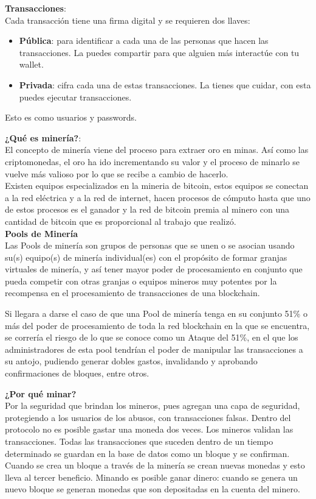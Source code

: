 \documentclass[a4paper,12pt]{/home/armando/Documentos/Cursos/LaTeX/Plantillas/lib/pub}
\begin{document}
\textbf{Transacciones}:\\
Cada transacción tiene una firma digital y se requieren dos llaves:
\begin{itemize}	
\item \textbf{Pública}: para identificar a cada una de las personas que hacen las transacciones.
La puedes compartir para que alguien más interactúe con tu wallet.
\item \textbf{Privada}: cifra cada una de estas transacciones.
La tienes que cuidar, con esta puedes ejecutar transacciones.
\end{itemize}
Esto es como usuarios y passwords.

\textbf{¿Qué es minería?}:\\
El concepto de minería viene del proceso para extraer oro en minas. Así como las criptomonedas, el oro ha ido incrementando su valor y el proceso de minarlo se vuelve más valioso por lo que se recibe a cambio de hacerlo.\\
Existen equipos especializados en la mineria de bitcoin, estos equipos se conectan a la red eléctrica y a la red de internet, hacen procesos de cómputo hasta que uno de estos procesos es el ganador y la red de bitcoin premia al minero con una cantidad de bitcoin que es proporcional al trabajo que realizó.
\\

\textbf{Pools de Minería}\\

Las Pools de minería son grupos de personas que se unen o se asocian usando su(s) equipo(s) de minería individual(es) con el propósito de formar granjas virtuales de minería, y así tener mayor poder de procesamiento en conjunto que pueda competir con otras granjas o equipos mineros muy potentes por la recompensa en el procesamiento de transacciones de una blockchain.

Si llegara a darse el caso de que una Pool de minería tenga en su conjunto 51\% o más del poder de procesamiento de toda la red blockchain en la que se encuentra, se correría el riesgo de lo que se conoce como un Ataque del 51\%, en el que los administradores de esta pool tendrían el poder de manipular las transacciones a su antojo, pudiendo generar dobles gastos, invalidando y aprobando confirmaciones de bloques, entre otros.

\textbf{¿Por qué minar?}\\

Por la seguridad que brindan los mineros, pues agregan una capa de seguridad, protegiendo a los usuarios de los abusos, con transacciones falsas. Dentro del protocolo no es posible gastar una moneda dos veces. Los mineros validan las transacciones.
Todas las transacciones que suceden dentro de un tiempo determinado se guardan en la base de datos como un bloque y se confirman. Cuando se crea un bloque a través de la minería se crean nuevas monedas y esto lleva al tercer beneficio.
Minando es posible ganar dinero: cuando se genera un nuevo bloque se generan monedas que son depositadas en la cuenta del minero.
\end{document}
